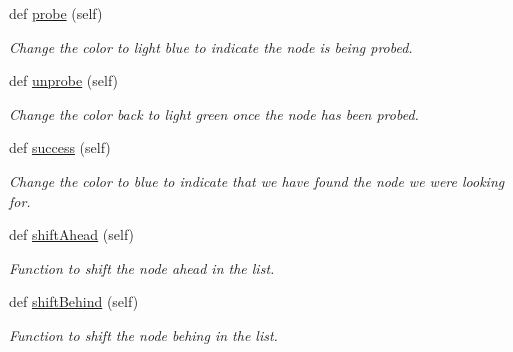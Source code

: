 \begin{DoxyCompactItemize}
\mbox{\label{class_doubly_linked_list_1_1_doubly_linked_list_node_acc998fb9e3968568dea96b640e9807c7}} 
def \hyperlink{class_doubly_linked_list_1_1_doubly_linked_list_node_acc998fb9e3968568dea96b640e9807c7}{probe} (self)
\begin{DoxyCompactList}\small\item\em Change the color to light blue to indicate the node is being probed. \end{DoxyCompactList}\item 
\mbox{\label{class_doubly_linked_list_1_1_doubly_linked_list_node_a6854439830f83b493d750f01bb85c6e1}} 
def \hyperlink{class_doubly_linked_list_1_1_doubly_linked_list_node_a6854439830f83b493d750f01bb85c6e1}{unprobe} (self)
\begin{DoxyCompactList}\small\item\em Change the color back to light green once the node has been probed. \end{DoxyCompactList}\item 
\mbox{\label{class_doubly_linked_list_1_1_doubly_linked_list_node_a33f669ff480546b6a50dfc33fcd24172}} 
def \hyperlink{class_doubly_linked_list_1_1_doubly_linked_list_node_a33f669ff480546b6a50dfc33fcd24172}{success} (self)
\begin{DoxyCompactList}\small\item\em Change the color to blue to indicate that we have found the node we were looking for. \end{DoxyCompactList}\item 
\mbox{\label{class_doubly_linked_list_1_1_doubly_linked_list_node_a29b57907050462c1eec31aea09202d66}} 
def \hyperlink{class_doubly_linked_list_1_1_doubly_linked_list_node_a29b57907050462c1eec31aea09202d66}{shift\+Ahead} (self)
\begin{DoxyCompactList}\small\item\em Function to shift the node ahead in the list. \end{DoxyCompactList}\item 
\mbox{\label{class_doubly_linked_list_1_1_doubly_linked_list_node_a7d6becf6cfac80a469a5c76121a258ab}} 
def \hyperlink{class_doubly_linked_list_1_1_doubly_linked_list_node_a7d6becf6cfac80a469a5c76121a258ab}{shift\+Behind} (self)
\begin{DoxyCompactList}\small\item\em Function to shift the node behing in the list. \end{DoxyCompactList}\end{DoxyCompactItemize}
